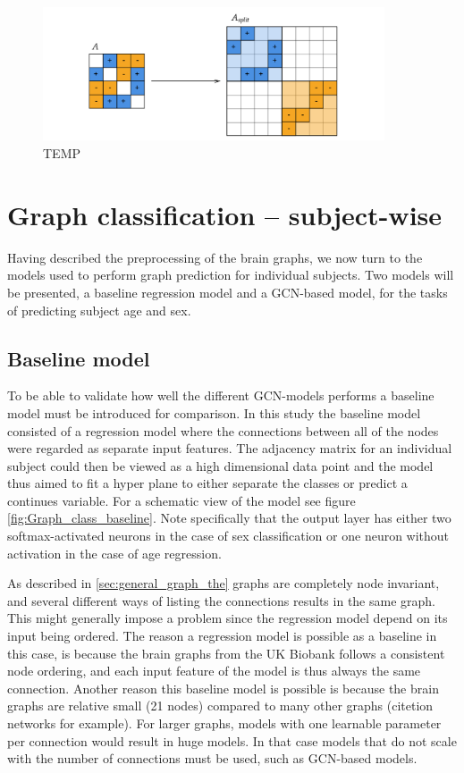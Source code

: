 \begin{figure}[H]
    \centering
    \includegraphics[width=0.9\textwidth]{chapters/images_methods/split.png}
    \caption{TEMP}
    \label{fig:block_diagonal_adjacency_matrix}
\end{figure}

\section{Graph classification -- subject-wise}

Having described the preprocessing of the brain graphs, we now turn to the models used to perform graph prediction for individual subjects. Two models will be presented, a baseline regression model and a GCN-based model, for the tasks of predicting subject age and sex.

\subsection{Baseline model}
To be able to validate how well the different GCN-models performs a baseline model must be introduced for comparison. In this study the baseline model consisted of a regression model where the connections between all of the nodes were regarded as separate input features. The adjacency matrix for an individual subject could then be viewed as a high dimensional data point and the model thus aimed to fit a hyper plane to either separate the classes or predict a continues variable. For a schematic view of the model see figure \ref{fig:Graph_class_baseline}. Note specifically that the output layer has either two softmax-activated neurons in the case of sex classification or one neuron without activation in the case of age regression. 

As described in \ref{sec:general_graph_the} graphs are completely node invariant, and several different ways of listing the connections results in the same graph. This might generally impose a problem since the regression model depend on its input being ordered. The reason a regression model is possible as a baseline in this case, is because the brain graphs from the UK Biobank follows a consistent node ordering, and each input feature of the model is thus always the same connection. Another reason this baseline model is possible is because the brain graphs are relative small (21 nodes) compared to many other graphs (citetion networks for example). For larger graphs, models with one learnable parameter per connection would result in huge models. In that case models that do not scale with the number of connections must be used, such as GCN-based models. 

